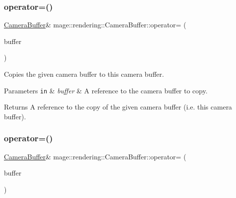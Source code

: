 \subsubsection{\texorpdfstring{operator=()}{operator=()}\hspace{0.1cm}{\footnotesize\ttfamily [1/2]}}
{\footnotesize\ttfamily \hyperlink{structmage_1_1rendering_1_1_camera_buffer}{Camera\+Buffer}\& mage\+::rendering\+::\+Camera\+Buffer\+::operator= (\begin{DoxyParamCaption}\item[{const \hyperlink{structmage_1_1rendering_1_1_camera_buffer}{Camera\+Buffer} \&}]{buffer }\end{DoxyParamCaption})\hspace{0.3cm}{\ttfamily [default]}}

Copies the given camera buffer to this camera buffer.


\begin{DoxyParams}[1]{Parameters}
\mbox{\tt in}  & {\em buffer} & A reference to the camera buffer to copy. \\
\hline
\end{DoxyParams}
\begin{DoxyReturn}{Returns}
A reference to the copy of the given camera buffer (i.\+e. this camera buffer). 
\end{DoxyReturn}
\hypertarget{structmage_1_1rendering_1_1_camera_buffer_a12658ff989daac2e910b91633ac0223d}{}\label{structmage_1_1rendering_1_1_camera_buffer_a12658ff989daac2e910b91633ac0223d} 
\subsubsection{\texorpdfstring{operator=()}{operator=()}\hspace{0.1cm}{\footnotesize\ttfamily [2/2]}}
{\footnotesize\ttfamily \hyperlink{structmage_1_1rendering_1_1_camera_buffer}{Camera\+Buffer}\& mage\+::rendering\+::\+Camera\+Buffer\+::operator= (\begin{DoxyParamCaption}\item[{\hyperlink{structmage_1_1rendering_1_1_camera_buffer}{Camera\+Buffer} \&\&}]{buffer }\end{DoxyParamCaption})\hspace{0.3cm}{\ttfamily [default]}}

